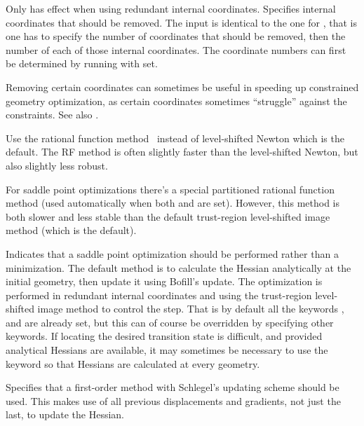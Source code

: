 \begin{description}
Only has effect when using redundant internal coordinates.
Specifies internal coordinates that should be removed. The input is
identical to the one for , that is one has to specify
the number of coordinates that should be removed, then the number of
each of those internal coordinates. The coordinate numbers can first
be determined by running with  set.

Removing certain coordinates can sometimes be useful in speeding up
constrained geometry optimization, as certain coordinates sometimes
``struggle'' against the constraints. See also .

\item[\Key{RF}]
Use the rational function method~\cite{abnajsrsjpc89} instead of
level-shifted Newton which is the default. The RF method is often
slightly faster than the level-shifted Newton, but also slightly less
robust.

For saddle point optimizations there's a special partitioned rational
function method (used automatically when both 
and  are set). However, this method is both slower and
less stable than the default trust-region level-shifted image method
(which is the default).

\item[\Key{SADDLE}]
Indicates that a saddle point optimization should be performed rather
than a minimization. The default method is to calculate the Hessian
analytically at the initial geometry, then update it using Bofill's
update. The optimization is performed in redundant internal
coordinates and using the trust-region level-shifted image method to
control the step. That is by default all the keywords ,
 and  are already set, but this can of course
be overridden by specifying other keywords. If locating the desired
transition state is difficult, and provided analytical Hessians are
available, it may sometimes be necessary to use the 
keyword so that Hessians are calculated at every geometry.

\item[\Key{SCHLEG}]
Specifies that a first-order method
with Schlegel's updating scheme
\cite{Schlegel} should be used. This makes use of all previous
displacements and gradients, not just the last, to update the
Hessian.


\end{description}
